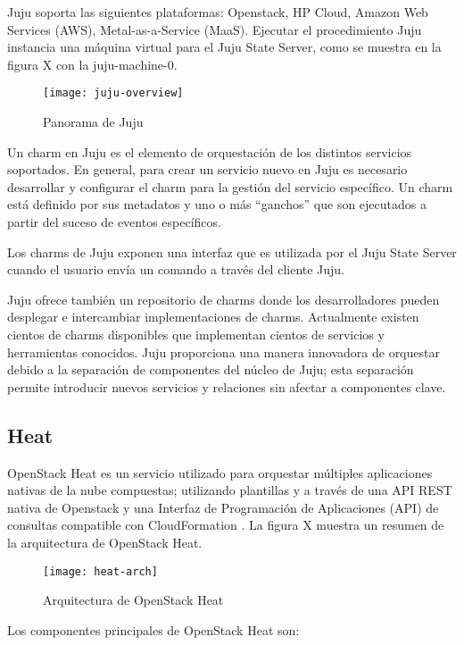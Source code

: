 Juju soporta las siguientes plataformas: Openstack, HP Cloud, Amazon Web Services (AWS), Metal-as-a-Service (MaaS). Ejecutar el procedimiento Juju instancia una máquina virtual  para el Juju State Server, como se muestra en la figura X con la juju-machine-0.


\begin{figure}[H]
    \centering
    \texttt{[image: juju-overview]}
    \caption{ Panorama de Juju \protect\cite{Metsch2013-et}}
    \label{fig:juju-overview}
\end{figure}

Un charm en Juju es el elemento de orquestación de los distintos servicios soportados. En general, para crear un servicio nuevo en Juju es necesario desarrollar y configurar el charm para la gestión del servicio específico. Un charm está definido por sus metadatos y uno o más “ganchos” que son ejecutados a partir del suceso de eventos específicos. 

Los charms de Juju exponen una interfaz que es utilizada por el Juju State Server cuando el usuario envía un comando a través del cliente Juju. 

Juju ofrece también un repositorio de charms donde los desarrolladores pueden desplegar e intercambiar implementaciones de charms. Actualmente existen cientos de charms disponibles que implementan cientos de servicios y herramientas conocidos. Juju proporciona una manera innovadora de orquestar debido a la separación de componentes del núcleo de Juju; esta separación permite introducir nuevos servicios y relaciones sin afectar a componentes clave.


\subsection{Heat}

OpenStack Heat es un servicio utilizado para orquestar múltiples aplicaciones nativas de la nube compuestas; utilizando plantillas y a través de una API REST nativa de Openstack y una Interfaz de Programación de Aplicaciones (API) de consultas compatible con CloudFormation \cite{Rackspace2016-jh}. La figura X muestra un resumen de la arquitectura de OpenStack Heat.
\begin{figure}[h!]
    \centering
    \texttt{[image: heat-arch]}
    \caption{ Arquitectura de OpenStack Heat \protect\cite{Metsch2013-et}}
    \label{fig:heat-arch}
\end{figure}
Los componentes principales de OpenStack Heat son:

